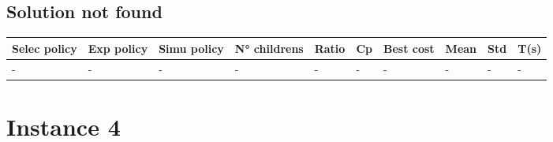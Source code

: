 \begin{center}
\begin{longtable}
    \bottomrule
  \end{longtable}
\end{center}

\subsection{Solution not found}
\begin{center}
  \small
  \begin{longtable}{||>{\centering\arraybackslash}p{1.3cm}
    >{\centering\arraybackslash}p{1.3cm}
    >{\centering\arraybackslash}p{1.3cm}
    >{\centering\arraybackslash}p{1.3cm}
    >{\centering\arraybackslash}p{0.7cm}
    >{\centering\arraybackslash}p{0.8cm}
    >{\centering\arraybackslash}p{1cm}
    >{\centering\arraybackslash}p{1cm}
    >{\centering\arraybackslash}p{1cm}
    >{\centering\arraybackslash}p{1cm}
    ||}
    \toprule
    Selec policy & Exp policy & Simu policy & N° childrens & Ratio & Cp & Best cost & Mean & Std & T(s) \\
    \midrule
    -            & -          & -           & -            & -     & -  & -         & -    & -   & -    \\
    \bottomrule
  \end{longtable}
\end{center}

\newpage
\section{Instance 4}


